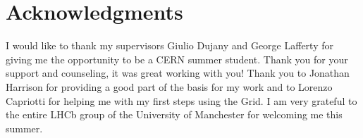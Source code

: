 \section{Acknowledgments}
I would like to thank my supervisors Giulio Dujany and George Lafferty for giving me the opportunity to be a CERN summer student. Thank you for your support and counseling, it was great working with you! 
Thank you to Jonathan Harrison for providing a good part of the basis for my work and to Lorenzo Capriotti for helping me with my first steps using the Grid. 
I am very grateful to the entire LHCb group of the University of Manchester for welcoming me this summer. 
